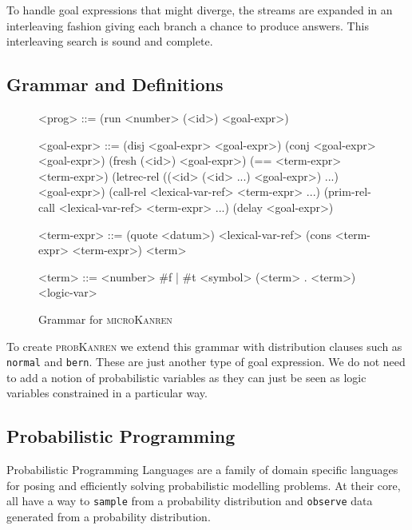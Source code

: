 \documentclass[
]{ceurart}
\begin{document}
To handle goal expressions that might diverge, the streams are
expanded in an interleaving\cite{kiselyov2005backtracking} fashion
giving each branch a chance to produce answers. This interleaving search
is sound and complete\cite{rozplokhas2019certified}.

\subsection{Grammar and Definitions}

\begin{figure}
  \centering
  \begin{grammar}
<prog> ::= (run <number> (<id>) <goal-expr>)

<goal-expr> ::= (disj <goal-expr> <goal-expr>) \alt
	        (conj <goal-expr> <goal-expr>) \alt
                (fresh (<id>) <goal-expr>) \alt
		(== <term-expr> <term-expr>) \alt
		(letrec-rel ((<id> (<id> ...) <goal-expr>) ...) \\
		\hspace{\grammarindent} <goal-expr>) \alt
		(call-rel <lexical-var-ref> <term-expr> ...) \alt
		(prim-rel-call <lexical-var-ref> <term-expr> ...) \alt
		(delay <goal-expr>)

<term-expr> ::= (quote <datum>) \alt
                <lexical-var-ref> \alt
                (cons <term-expr> <term-expr>) \alt
                <term>

<term> ::= <number> \alt
           \#f | \#t \alt
	   <symbol> \alt
	   (<term> . <term>) \alt
	   <logic-var>

  \end{grammar}
  \caption{Grammar for \textsc{microKanren}}
  \label{fig:grammar}
\end{figure}

To create \textsc{probKanren} we extend this grammar with distribution clauses
such as \texttt{normal} and \texttt{bern}. These are just another type
of goal expression. We do not need to add a notion of probabilistic
variables as they can just be seen as logic variables constrained in
a particular way.


\subsection{Probabilistic Programming}

Probabilistic Programming Languages\cite{wood2014new,
  van2018introduction} are a family of domain specific languages for
posing and efficiently solving probabilistic modelling problems. At
their core, all have a way to \texttt{sample} from a probability
distribution and \texttt{observe} data generated from a probability
distribution.
\end{document}
